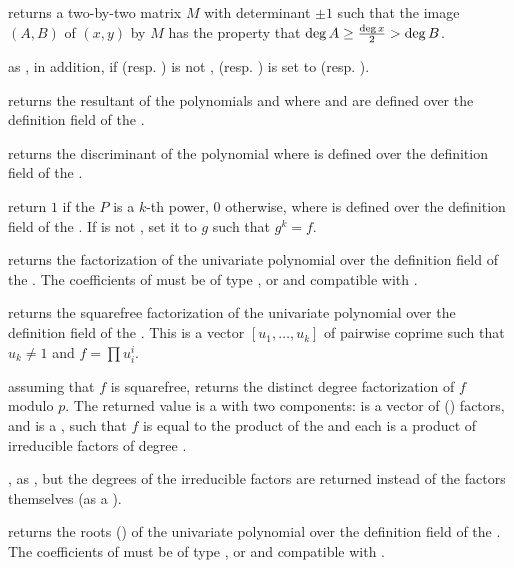  returns a two-by-two matrix
$M$ with determinant $\pm 1$ such that the image $(A,B)$ of $(x,y)$ by $M$
has the property that $\deg A \geq {\deg x \over 2} > \deg B$.

as , in addition, if  (resp. ) is not
,  (resp. ) is set to  (resp. ).

 returns the resultant of the polynomials
 and  where  and  are defined over the definition
field of the  .

 returns the discriminant of the polynomial
 where  is defined over the definition field of the 
.

return $1$ if the  $P$ is a $k$-th power, $0$ otherwise,
where  is defined over the definition field of the  .
If  is not , set it to $g$ such that $g^k = f$.

 returns the factorization of the univariate
polynomial  over the definition field of the  . The
coefficients of  must be of type ,  or 
and compatible with .

 returns the squarefree
factorization of the univariate polynomial  over the definition field of
the  .  This is a vector $[u_1,\dots,u_k]$ of pairwise
coprime  such that $u_k \neq 1$ and $f = \prod u_i^i$.

 assuming that $f$ is squarefree,
returns the distinct degree factorization of $f$ modulo $p$.
The returned value  is a  with two
components:  is a vector of ()
factors, and  is a , such that
$f$ is equal to the product of the  and each 
is a product of irreducible factors of degree .

, as , but the
degrees of the irreducible factors are returned instead of the factors
themselves (as a ).

 returns the roots ()
of the univariate polynomial  over the definition field of the
 . The coefficients of  must be of type ,
 or  and compatible with .

